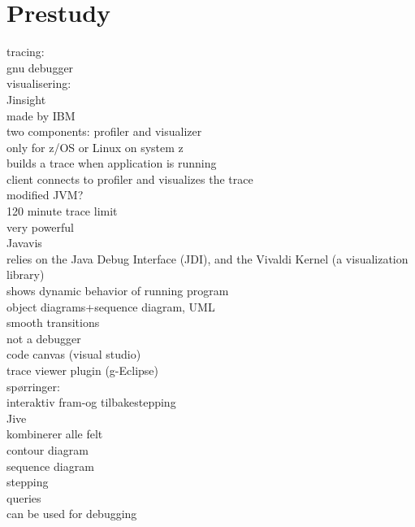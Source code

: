 \section{Prestudy}\label{Prestudy}

tracing:\\
gnu debugger\\

visualisering:\\


Jinsight\\
	made by IBM\\
	two components: profiler and visualizer\\
	only for z/OS or Linux on system z\\
	builds a trace when application is running\\
	client connects to profiler and visualizes the trace\\
	modified JVM?\\
	120 minute trace limit\\
	very powerful\\


Javavis\\
	relies on the Java Debug Interface (JDI), and the Vivaldi Kernel (a visualization library)\\
	shows dynamic behavior of running program\\
	object diagrams+sequence diagram, UML\\
	smooth transitions\\
	not a debugger\\
	
code canvas (visual studio)\\


trace viewer plugin (g-Eclipse)\\

spørringer:\\


interaktiv fram-og tilbakestepping\\


Jive\\
	kombinerer alle felt\\
	contour diagram\\
	sequence diagram\\
	stepping\\
	queries\\
	can be used for debugging\\




